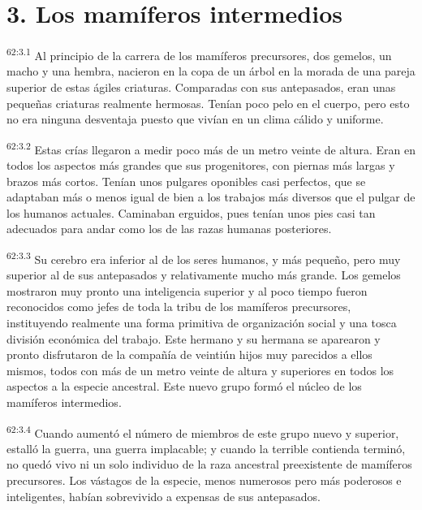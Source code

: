 \section*{3. Los mamíferos intermedios}
\par
\textsuperscript{62:3.1} Al principio de la carrera de los mamíferos precursores, dos gemelos, un macho y una hembra, nacieron en la copa de un árbol en la morada de una pareja superior de estas ágiles criaturas. Comparadas con sus antepasados, eran unas pequeñas criaturas realmente hermosas. Tenían poco pelo en el cuerpo, pero esto no era ninguna desventaja puesto que vivían en un clima cálido y uniforme.

\par
\textsuperscript{62:3.2} Estas crías llegaron a medir poco más de un metro veinte de altura. Eran en todos los aspectos más grandes que sus progenitores, con piernas más largas y brazos más cortos. Tenían unos pulgares oponibles casi perfectos, que se adaptaban más o menos igual de bien a los trabajos más diversos que el pulgar de los humanos actuales. Caminaban erguidos, pues tenían unos pies casi tan adecuados para andar como los de las razas humanas posteriores.

\par
\textsuperscript{62:3.3} Su cerebro era inferior al de los seres humanos, y más pequeño, pero muy superior al de sus antepasados y relativamente mucho más grande. Los gemelos mostraron muy pronto una inteligencia superior y al poco tiempo fueron reconocidos como jefes de toda la tribu de los mamíferos precursores, instituyendo realmente una forma primitiva de organización social y una tosca división económica del trabajo. Este hermano y su hermana se aparearon y pronto disfrutaron de la compañía de veintiún hijos muy parecidos a ellos mismos, todos con más de un metro veinte de altura y superiores en todos los aspectos a la especie ancestral. Este nuevo grupo formó el núcleo de los mamíferos intermedios.

\par
\textsuperscript{62:3.4} Cuando aumentó el número de miembros de este grupo nuevo y superior, estalló la guerra, una guerra implacable; y cuando la terrible contienda terminó, no quedó vivo ni un solo individuo de la raza ancestral preexistente de mamíferos precursores. Los vástagos de la especie, menos numerosos pero más poderosos e inteligentes, habían sobrevivido a expensas de sus antepasados.

